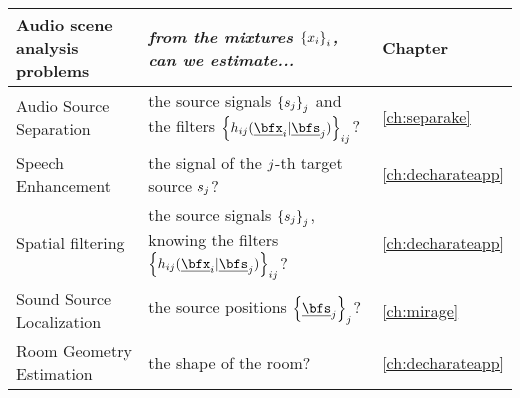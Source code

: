 \begin{tabular}{p{0.30\linewidth} p{0.60\linewidth} p{0.10\linewidth}}
    \toprule
    Audio scene analysis problems & \textit{from the mixtures $\setMicSignals$, can we estimate...}  & Chapter\\
    \midrule




    Audio Source Separation     & the source signals $\setSrcSignals$ and the filters $\setFltSignals$? & \cref{ch:separake}\\

    Speech Enhancement          & the signal of the $j$-th target source $s_{j}$?        & \cref{ch:decharateapp}\\

    Spatial filtering           & the source signals $\setSrcSignals$, knowing the filters $\setFltSignals$? & \cref{ch:decharateapp}\\

    Sound Source Localization   & the source positions $\setSrcPositions$?                              & \cref{ch:mirage}\\

    Room Geometry Estimation    & the shape of the room?                                                & \cref{ch:decharateapp}\\
    \bottomrule
\end{tabular}